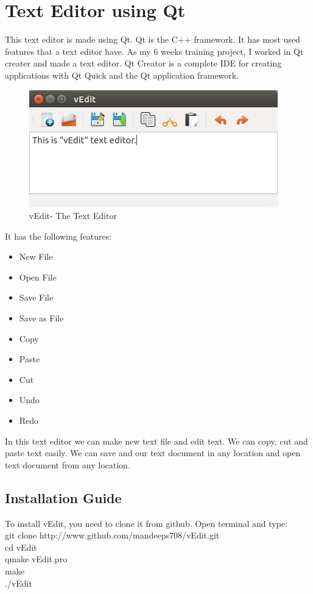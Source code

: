 \section{Text Editor using Qt}
This text editor is made using Qt. Qt is the C++ framework. It has most used features that a text editor have. 
\noindent As my 6 weeks training project,  I worked  in Qt creater and made a text editor.
Qt Creator is a complete IDE for creating applications with Qt Quick and the Qt application framework.
\begin{figure}[h]
\begin{center}
\includegraphics[scale=0.7]{images/vedit.png}
\caption{vEdit- The Text Editor}
\end{center}
\end{figure}

It has the following features:
\begin{itemize}
\item New File
\item Open File
\item Save File
\item Save as File
\item Copy
\item Paste
\item Cut
\item Undo
\item Redo
\end{itemize}

In this text editor we can make new text file and edit text. We can copy, cut and paste text easily. We can save and our text document in any location and open text document from any location. 

\subsection{Installation Guide}
To install vEdit, you need to clone it from github.
Open terminal and type:\\
git clone http://www.github.com/mandeeps708/vEdit.git\\
cd vEdit\\
qmake vEdit.pro\\
make\\
./vEdit\\


